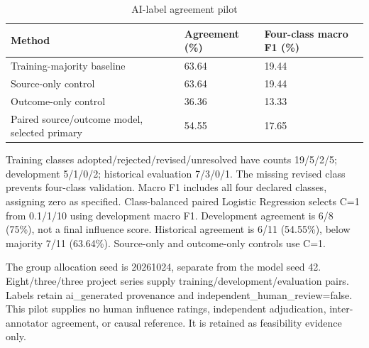 \documentclass[journal,onecolumn]{IEEEtran}
\begin{document}
\begin{table}[htbp]
\centering\footnotesize
\caption{AI-label agreement pilot}
\setlength{\tabcolsep}{3pt}
\renewcommand{\arraystretch}{1.15}
\begin{tabular}{p{}p{}p{}}
\toprule
{\raggedright Method\par} & {\raggedright Agreement (\%)\par} & {\raggedright Four-class macro F1 (\%)\par} \\
\midrule
{\raggedright Training-majority baseline\par} & {\raggedright 63.64\par} & {\raggedright 19.44\par} \\
{\raggedright Source-only control\par} & {\raggedright 63.64\par} & {\raggedright 19.44\par} \\
{\raggedright Outcome-only control\par} & {\raggedright 36.36\par} & {\raggedright 13.33\par} \\
{\raggedright Paired source/outcome model, selected primary\par} & {\raggedright 54.55\par} & {\raggedright 17.65\par} \\
\bottomrule
\end{tabular}
\end{table}
Training classes adopted/rejected/revised/unresolved have counts 19/5/2/5; development 5/1/0/2; historical evaluation 7/3/0/1. The missing revised class prevents four-class validation. Macro F1 includes all four declared classes, assigning zero as specified. Class-balanced paired Logistic Regression selects C=1 from 0.1/1/10 using development macro F1. Development agreement is 6/8 (75\%), not a final influence score. Historical agreement is 6/11 (54.55\%), below majority 7/11 (63.64\%). Source-only and outcome-only controls use C=1.

The group allocation seed is 20261024, separate from the model seed 42. Eight/three/three project series supply training/development/evaluation pairs. Labels retain ai\_\allowbreak{}generated provenance and independent\_\allowbreak{}human\_\allowbreak{}review=false. This pilot supplies no human influence ratings, independent adjudication, inter-annotator agreement, or causal reference. It is retained as feasibility evidence only.
\end{document}
